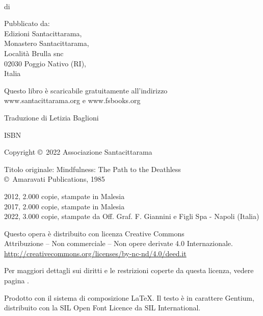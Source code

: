 {\small\setlength{\parskip}{0.8em}\setlength{\parindent}{0em}%
{\raggedright%

\enlargethispage*{\baselineskip}

\thetitle\\
di \theauthor

Pubblicato da:\\
Edizioni Santacittarama,\\
Monastero Santacittarama,\\
Località Brulla snc\\
02030 Poggio Nativo (RI), \\
Italia

Questo libro è scaricabile gratuitamente all’indirizzo\\
www.santacittarama.org e www.fsbooks.org

Traduzione di Letizia Baglioni

ISBN \theISBN

Copyright \copyright\ 2022 Associazione Santacittarama


Titolo originale: Mindfulness: The Path to the Deathless\\
\copyright\ Amaravati Publications, 1985


\vfill

\raggedright
2012, 2.000 copie, stampate in Malesia\\
2017, 2.000 copie, stampate in Malesia\\
2022, 3.000 copie, stampate da Off. Graf. F. Giannini e Figli Spa - Napoli (Italia)

\vspace*{3\baselineskip}

\centering\smaller
Questo opera è distribuito con licenza Creative Commons\\ Attribuzione – Non commerciale – Non opere derivate 4.0 Internazionale.\\
\href{http://creativecommons.org/licenses/by-nc-nd/4.0/deed.it}{http://creativecommons.org/licenses/by-nc-nd/4.0/deed.it}

Per maggiori dettagli sui diritti e le restrizioni coperte da questa licenza, vedere pagina \pageref{copyright-details}.

Prodotto con il sistema di composizione {\selectfont\LaTeX}. Il testo è in carattere Gentium, distribuito con la SIL Open Font Licence da SIL International.




}}

